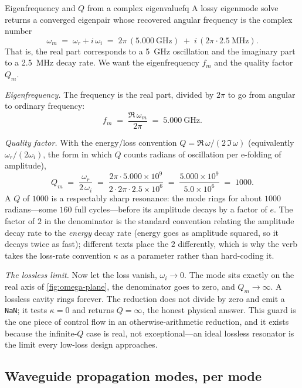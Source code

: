 \begin{workedexample}{Eigenfrequency and $Q$ from a complex eigenvalue}{fq}
A lossy eigenmode solve returns a converged eigenpair whose recovered angular
frequency is the complex number
\[
  \omega_m \;=\; \omega_r + i\,\omega_i
            \;=\; 2\pi\,(\SI{5.000}{\giga\hertz}) \;+\; i\,(2\pi\cdot\SI{2.5}{\mega\hertz}).
\]
That is, the real part corresponds to a \SI{5}{\giga\hertz} oscillation and the
imaginary part to a \SI{2.5}{\mega\hertz} decay rate. We want the eigenfrequency
$f_m$ and the quality factor $Q_m$.

\emph{Eigenfrequency.} The frequency is the real part, divided by $2\pi$ to go
from angular to ordinary frequency:
\[
  f_m \;=\; \frac{\Re\,\omega_m}{2\pi} \;=\; \SI{5.000}{\giga\hertz}.
\]

\emph{Quality factor.} With the energy/loss convention $Q=\Re\,\omega/(2\,\Im\,\omega)$
(equivalently $\omega_r/(2\omega_i)$, the form in which $Q$ counts radians of
oscillation per e-folding of amplitude),
\[
  Q_m \;=\; \frac{\omega_r}{2\,\omega_i}
        \;=\; \frac{2\pi\cdot 5.000\times 10^{9}}{2\cdot 2\pi\cdot 2.5\times 10^{6}}
        \;=\; \frac{5.000\times 10^{9}}{5.0\times 10^{6}}
        \;=\; 1000 .
\]
A $Q$ of $1000$ is a respectably sharp resonance: the mode rings for about $1000$
radians---some $160$ full cycles---before its amplitude decays by a factor of
$e$. The factor of $2$ in the denominator is the standard convention relating the
amplitude decay rate to the \emph{energy} decay rate (energy goes as amplitude
squared, so it decays twice as fast); different texts place the $2$ differently,
which is why the verb takes the loss-rate convention $\kappa$ as a parameter
rather than hard-coding it.

\emph{The lossless limit.} Now let the loss vanish, $\omega_i\to 0$. The mode
sits exactly on the real axis of \cref{fig:omega-plane}, the denominator goes to
zero, and $Q_m\to\infty$. A lossless cavity rings forever. The reduction does not
divide by zero and emit a \texttt{NaN}; it tests $\kappa=0$ and returns
$Q=\infty$, the honest physical answer. This guard is the one piece of
control flow in an otherwise-arithmetic reduction, and it exists because the
infinite-$Q$ case is real, not exceptional---an ideal lossless resonator is the
limit every low-loss design approaches.
\end{workedexample}

\subsection{Waveguide propagation modes, per mode}
\label{sec:wg-table}

